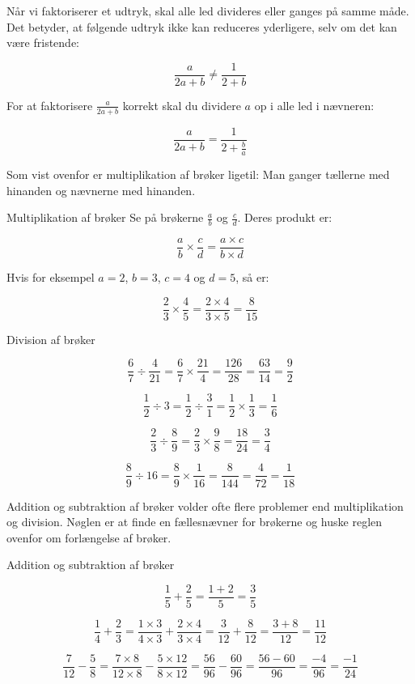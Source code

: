 Når vi faktoriserer et udtryk, skal alle led divideres eller ganges på samme måde. Det betyder, at følgende udtryk ikke kan reduceres yderligere, selv om det kan være fristende:

\[
\frac{a}{2a + b} \neq \frac{1}{2 + b}
\]

For at faktorisere \(\frac{a}{2a + b}\) korrekt skal du dividere \(a\) op i alle led i nævneren:

\[
\frac{a}{2a + b} = \frac{1}{2 + \frac{b}{a}}
\]

Som vist ovenfor er multiplikation af brøker ligetil: Man ganger tællerne med hinanden og nævnerne med hinanden.

\begin{example} Multiplikation af brøker \newline
Se på brøkerne \(\frac{a}{b}\) og \(\frac{c}{d}\). Deres produkt er:

\[
\frac{a}{b} \times \frac{c}{d} = \frac{a \times c}{b \times d}
\]

Hvis for eksempel \(a = 2\), \(b = 3\), \(c = 4\) og \(d = 5\), så er:

\[
\frac{2}{3} \times \frac{4}{5} = \frac{2 \times 4}{3 \times 5} = \frac{8}{15}
\]
  
\end{example} 

\begin{example} Division af brøker

\[
\frac{6}{7} \div \frac{4}{21} = \frac{6}{7} \times \frac{21}{4} = \frac{126}{28} = \frac{63}{14} = \frac{9}{2}
\]

\[
\frac{1}{2} \div 3 = \frac{1}{2} \div \frac{3}{1} = \frac{1}{2} \times \frac{1}{3} = \frac{1}{6}
\]

\[
\frac{2}{3} \div \frac{8}{9} = \frac{2}{3} \times \frac{9}{8} = \frac{18}{24} = \frac{3}{4}
\]

\[
\frac{8}{9} \div 16 = \frac{8}{9} \times \frac{1}{16} = \frac{8}{144} = \frac{4}{72} = \frac{1}{18}
\]
  
\end{example}

Addition og subtraktion af brøker volder ofte flere problemer end multiplikation og division. Nøglen er at finde en fællesnævner for brøkerne og huske reglen ovenfor om forlængelse af brøker.

\begin{example} Addition og subtraktion af brøker

 \[
\frac{1}{5} + \frac{2}{5} = \frac{1 + 2}{5} = \frac{3}{5}
\]

\[
\frac{1}{4} + \frac{2}{3} = \frac{1 \times 3}{4 \times 3} + \frac{2 \times 4}{3 \times 4} = \frac{3}{12} + \frac{8}{12} = \frac{3 + 8}{12} = \frac{11}{12}
\]

\[
\frac{7}{12} - \frac{5}{8} = \frac{7 \times 8}{12 \times 8} - \frac{5 \times 12}{8 \times 12} = \frac{56}{96} - \frac{60}{96} = \frac{56 - 60}{96} = \frac{-4}{96} = \frac{-1}{24}
\]

\end{example}

